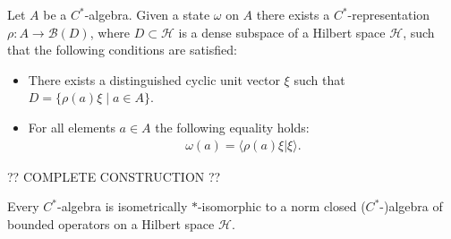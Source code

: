     \begin{construct}\label{operators:gns}
        Let $A$ be a $C^*$-algebra. Given a state $\omega$ on $A$ there exists a $C^*$-representation $\rho:A\rightarrow\mathcal{B}(D)$, where $D\subset\mathcal{H}$ is a dense subspace of a Hilbert space $\mathcal{H}$, such that the following conditions are satisfied:
        \begin{itemize}
            \item There exists a distinguished cyclic unit vector $\xi$ such that $D = \{\rho(a)\xi\mid a\in A\}$.
            \item For all elements $a\in A$ the following equality holds:
                \begin{gather}
                    \omega(a) = \langle\rho(a)\xi|\xi\rangle.
                \end{gather}
        \end{itemize}

        ?? COMPLETE CONSTRUCTION ??
    \end{construct}

    \begin{theorem}\label{operators:gelfand_naimark}
        Every $C^*$-algebra is isometrically $\ast$-isomorphic to a norm closed ($C^*$-)algebra of bounded operators on a Hilbert space $\mathcal{H}$.
    \end{theorem}

\subsection{}

